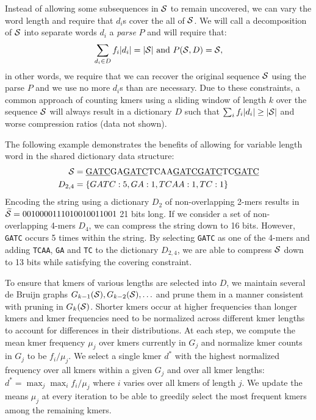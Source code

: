 \documentclass[12pt]{cmuthesis}
\begin{document}
  Instead of allowing some subsequences in $\mathcal{S}$ to remain uncovered, we can vary the word length and require that $d_i$s cover the all of $\mathcal{S}$. We will call a decomposition of $\mathcal{S}$ into separate words $d_i$ a \textit{parse} $P$ and will require that:
  \begin{align}
  \label{eqn:constraints}
  \sum_{d_i \in D} f_i |d_i| = |\mathcal{S}|~\textrm{and}~P(\mathcal{S}, D) = \mathcal{S},
  \end{align}
  in other words, we require that we can recover the original sequence $\mathcal{S}$ using the parse $P$ and we use no more $d_i$s than are necessary.
  Due to these constraints, a common approach of counting kmers using a sliding window of length $k$ over the sequence $\mathcal{S}$ will always result in a dictionary $D$ such that $\sum_{i} f_i |d_i| \geq |\mathcal{S}|$ and worse compression ratios (data not shown).

  The following example demonstrates the benefits of allowing for variable length word in the shared dictionary data structure:
  \begin{align*}
    \mathcal{S} &= \textrm{\underline{GATC}GA\underline{GATC}TCAA\underline{GATC}\underline{GATC}TC\underline{GATC}} \\
    D_{2,4} &= \{GATC: 5, GA: 1, TCAA: 1, TC: 1\}
  \end{align*}
  Encoding the string using a dictionary $D_2$ of non-overlapping 2-mers results in $\widetilde{\mathcal{S}} = 0010000111010010011001$ 21 bits long. If we consider a set of non-overlapping 4-mers $D_4$, we 
  can compress the string down to 16 bits. However, \texttt{GATC} occurs 5 times within the string. By selecting \texttt{GATC} as one of the 4-mers and adding \texttt{TCAA}, \texttt{GA} and \texttt{TC} to the dictionary $D_{2,4}$, we are able to compress $\mathcal{S}$ down to 13 bits while satisfying the covering constraint. 

  To ensure that kmers of various lengths are selected into $D$, we maintain several de Bruijn graphs $G_{k-1}(\mathcal{S}), G_{k-2}(\mathcal{S}), \ldots$ and prune them in a manner consistent with pruning in $G_{k}(\mathcal{S})$. Shorter kmers occur at higher frequencies than longer kmers and kmer frequencies need to be normalized across different kmer lengths to account for differences in their distributions. At each step, we compute the mean kmer frequency $\mu_j$ over kmers currently in $G_{j}$ and normalize kmer counts in $G_j$ to be $f_i / \mu_j$. We select a single kmer $d^*$ with the highest normalized frequency over all kmers within a given $G_j$ and over all kmer lengths: $d^* = \max_j \max_i f_i / \mu_j$ where $i$ varies over all kmers of length $j$. We update the means $\mu_j$ at every iteration to be able to greedily select the most frequent kmers among the remaining kmers.
\end{document}
